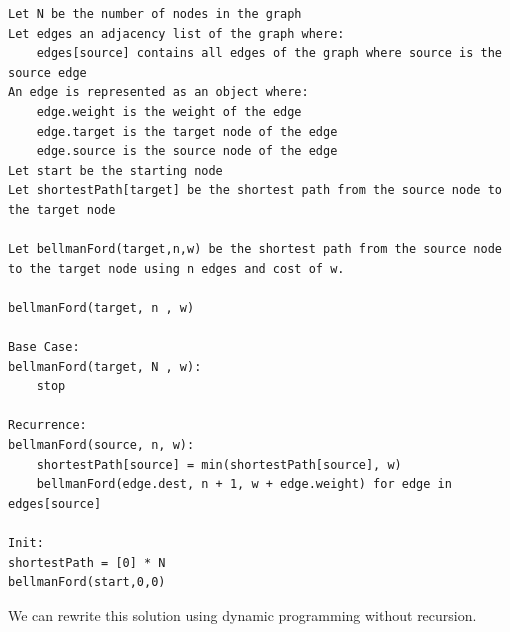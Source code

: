\documentclass[11pt,oneside]{book}
\begin{document}
\begin{lstlisting}
Let N be the number of nodes in the graph
Let edges an adjacency list of the graph where:
    edges[source] contains all edges of the graph where source is the source edge
An edge is represented as an object where:
    edge.weight is the weight of the edge
    edge.target is the target node of the edge
    edge.source is the source node of the edge
Let start be the starting node
Let shortestPath[target] be the shortest path from the source node to the target node

Let bellmanFord(target,n,w) be the shortest path from the source node to the target node using n edges and cost of w.

bellmanFord(target, n , w)

Base Case:
bellmanFord(target, N , w):
    stop

Recurrence:
bellmanFord(source, n, w):
    shortestPath[source] = min(shortestPath[source], w)
    bellmanFord(edge.dest, n + 1, w + edge.weight) for edge in edges[source]

Init:
shortestPath = [0] * N
bellmanFord(start,0,0)
\end{lstlisting}

We can rewrite this solution using dynamic programming without recursion.
\end{document}
